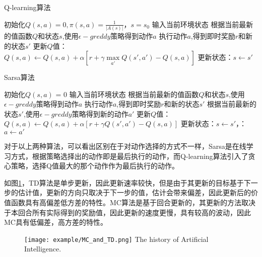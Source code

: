 \begin{algorithm}
	\caption{Q-learning算法}
	\label{algo:Q}
	\begin{algorithmic}[1] %
		\State 初始化$Q(s,a) = 0,\pi (s,a) = \frac{1}{{|A(s)|}}，s = {s_0}$
		\State 输入当前环境状态
		  \State 
		根据当前最新的值函数$Q$和状态$ s $,使用$\epsilon - greddy$策略得到动作$ a $
		  \State 执行动作$ a$,得到即时奖励$r$和新的状态$ s'$
		  \State 更新$ Q $值：$ Q(s,a) \leftarrow Q(s,a) + \alpha [r + \gamma \mathop {\max }\limits_{a'} Q(s',a') - Q(s,a)]$
		  \State 更新状态：$s \leftarrow s'$
		  \EndFor
		\EndFor
	\end{algorithmic}
\end{algorithm}

\begin{algorithm}
	\caption{Sarsa算法}
	\label{algo:sarsa}
	\begin{algorithmic}[1] %
		\State 初始化$Q(s,a)$ = 0
		\Repeat 
		\State 输入当前环境状态
		\State 根据当前最新的值函数$Q$和状态$ s $,使用$\epsilon - greddy$策略得到动作$ a $
		\State 执行动作$ a$,得到即时奖励$r$和新的状态$ s'$
		\State 根据当前最新的状态$ s' $,使用$\epsilon - greddy$策略得到新的动作$ a' $
		\State 更新$ Q $值：$ Q(s,a) \leftarrow Q(s,a) + \alpha [r + \gamma Q(s',a') - Q(s,a)]$
		\State 更新状态：$s \leftarrow s'$，：$a \leftarrow a'$
		\EndFor
	\end{algorithmic}
\end{algorithm}
对于以上两种算法，可以看出区别在于对动作选择的方式不一样，Sarsa是在线学习方式，根据策略选择出的动作即是最后执行的动作，而Q-learning算法引入了贪心策略，选择Q值最大的那个动作作为最后执行的动作。

如图\ref{fig:4}，TD算法是单步更新，因此更新速率较快，但是由于其更新的目标基于下一步的估计值，更新的方向只取决于下一步的值，估计会带来偏差，因此更新后的价值函数具有高偏差低方差的特性。MC算法是基于回合更新的，其更新的方法取决于本回合所有实际得到的奖励值，因此更新的速度更慢，具有较高的波动，因此MC具有低偏差，高方差的特性。
\begin{figure}[htpb]
	\centering
	\texttt{[image: example/MC\_and\_TD.png]}
	{The history of Artificial Intelligence.}
	\label{fig:4}
\end{figure}

